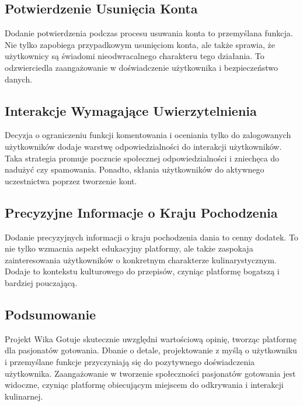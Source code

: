 \documentclass{article}
\begin{document}
\subsection{Potwierdzenie Usunięcia Konta}
    Dodanie potwierdzenia podczas procesu usuwania konta to przemyślana funkcja. Nie tylko zapobiega przypadkowym usunięciom konta, ale także sprawia, że użytkownicy są świadomi nieodwracalnego charakteru tego działania. To odzwierciedla zaangażowanie w doświadczenie użytkownika i bezpieczeństwo danych.
\subsection{Interakcje Wymagające Uwierzytelnienia}
    Decyzja o ograniczeniu funkcji komentowania i oceniania tylko do zalogowanych użytkowników dodaje warstwę odpowiedzialności do interakcji użytkowników. Taka strategia promuje poczucie społecznej odpowiedzialności i zniechęca do nadużyć czy spamowania. Ponadto, skłania użytkowników do aktywnego uczestnictwa poprzez tworzenie kont.
\subsection{Precyzyjne Informacje o Kraju Pochodzenia}
    Dodanie precyzyjnych informacji o kraju pochodzenia dania to cenny dodatek. To nie tylko wzmacnia aspekt edukacyjny platformy, ale także zaspokaja zainteresowania użytkowników o konkretnym charakterze kulinarystycznym. Dodaje to kontekstu kulturowego do przepisów, czyniąc platformę bogatszą i bardziej pouczającą.
\subsection{Podsumowanie}
    Projekt Wika Gotuje skutecznie uwzględni wartościową opinię, tworząc platformę dla pasjonatów gotowania. Dbanie o detale, projektowanie z myślą o użytkowniku i przemyślane funkcje przyczyniają się do pozytywnego doświadczenia użytkownika. Zaangażowanie w tworzenie społeczności pasjonatów gotowania jest widoczne, czyniąc platformę obiecującym miejscem do odkrywania i interakcji kulinarnej.
\end{document}
